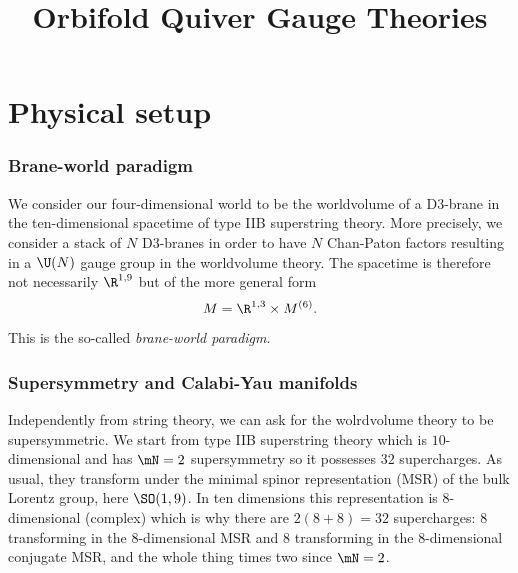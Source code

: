\documentclass{worksheetclass}
\title{Orbifold Quiver Gauge Theories}
\begin{document}
\maketitle

\tableofcontents

\section{Physical setup}

    \subsubsection*{Brane-world paradigm}

        We consider our four-dimensional world to be the worldvolume of a D$3$-brane in the ten-dimensional spacetime of type IIB superstring theory. More precisely, we consider a stack of $N$ D$3$-branes in order to have $N$ Chan-Paton factors resulting in a $\U(N)$ gauge group in the worldvolume theory. The spacetime is therefore not necessarily $\R^{1,9}$ but of the more general form
        \begin{equation}
            M = \R^{1,3}\times M^{(6)}.\label{spacetimedecomp}
        \end{equation}
        This is the so-called \emph{brane-world paradigm}. %

    \subsubsection*{Supersymmetry and Calabi-Yau manifolds}
    
        Independently from string theory, we can ask for the wolrdvolume theory to be supersymmetric. We start from type IIB superstring theory which is $10$-dimensional and has $\mN=2$ supersymmetry so it possesses $32$ supercharges. As usual, they transform under the minimal spinor representation (MSR) of the bulk Lorentz group, here $\SO(1,9)$. In ten dimensions this representation is $8$-dimensional (complex) which is why there are $2(8+8)=32$ supercharges: $8$ transforming in the $8$-dimensional MSR and $8$ transforming in the $8$-dimensional conjugate MSR, and the whole thing times two since $\mN=2$. 
        
\end{document}
